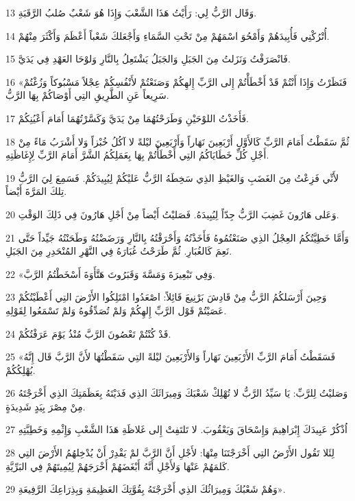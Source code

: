 \par 13 وَقَال الرَّبُّ لِي: رَأَيْتُ هَذَا الشَّعْبَ وَإِذَا هُوَ شَعْبٌ صُلبُ الرَّقَبَةِ.
\par 14 أُتْرُكْنِي فَأُبِيدَهُمْ وَأَمْحُوَ اسْمَهُمْ مِنْ تَحْتِ السَّمَاءِ وَأَجْعَلكَ شَعْباً أَعْظَمَ وَأَكْثَرَ مِنْهُمْ.
\par 15 فَانْصَرَفْتُ وَنَزَلتُ مِنَ الجَبَلِ وَالجَبَلُ يَشْتَعِلُ بِالنَّارِ وَلوْحَا العَهْدِ فِي يَدَيَّ.
\par 16 «فَنَظَرْتُ وَإِذَا أَنْتُمْ قَدْ أَخْطَأْتُمْ إِلى الرَّبِّ إِلهِكُمْ وَصَنَعْتُمْ لأَنْفُسِكُمْ عِجْلاً مَسْبُوكاً وَزُغْتُمْ سَرِيعاً عَنِ الطَّرِيقِ التِي أَوْصَاكُمْ بِهَا الرَّبُّ.
\par 17 فَأَخَذْتُ اللوْحَيْنِ وَطَرَحْتُهُمَا مِنْ يَدَيَّ وَكَسَّرْتُهُمَا أَمَامَ أَعْيُنِكُمْ.
\par 18 ثُمَّ سَقَطْتُ أَمَامَ الرَّبِّ كَالأَوَّلِ أَرْبَعِينَ نَهَاراً وَأَرْبَعِينَ ليْلةً لا آكُلُ خُبْزاً وَلا أَشْرَبُ مَاءً مِنْ أَجْلِ كُلِّ خَطَايَاكُمُ التِي أَخْطَأْتُمْ بِهَا بِعَمَلِكُمُ الشَّرَّ أَمَامَ الرَّبِّ لِإِغَاظَتِهِ.
\par 19 لأَنِّي فَزِعْتُ مِنَ الغَضَبِ وَالغَيْظِ الذِي سَخِطَهُ الرَّبُّ عَليْكُمْ لِيُبِيدَكُمْ. فَسَمِعَ لِيَ الرَّبُّ تِلكَ المَرَّةَ أَيْضاً.
\par 20 وَعَلى هَارُونَ غَضِبَ الرَّبُّ جِدّاً لِيُبِيدَهُ. فَصَليْتُ أَيْضاً مِنْ أَجْلِ هَارُونَ فِي ذَلِكَ الوَقْتِ.
\par 21 وَأَمَّا خَطِيَّتُكُمُ العِجْلُ الذِي صَنَعْتُمُوهُ فَأَخَذْتُهُ وَأَحْرَقْتُهُ بِالنَّارِ وَرَضَضْتُهُ وَطَحَنْتُهُ جَيِّداً حَتَّى نَعِمَ كَالغُبَارِ. ثُمَّ طَرَحْتُ غُبَارَهُ فِي النَّهْرِ المُنْحَدِرِ مِنَ الجَبَلِ.
\par 22 «وَفِي تَبْعِيرَةَ وَمَسَّةَ وَقَبَرُوتَ هَتَّأَوَةَ أَسْخَطْتُمُ الرَّبَّ.
\par 23 وَحِينَ أَرْسَلكُمُ الرَّبُّ مِنْ قَادِشَ بَرْنِيعَ قَائِلاً: اصْعَدُوا امْتَلِكُوا الأَرْضَ التِي أَعْطَيْتُكُمْ عَصَيْتُمْ قَوْل الرَّبِّ إِلهِكُمْ وَلمْ تُصَدِّقُوهُ وَلمْ تَسْمَعُوا لِقَوْلِهِ.
\par 24 قَدْ كُنْتُمْ تَعْصُونَ الرَّبَّ مُنْذُ يَوْمَ عَرَفْتُكُمْ.
\par 25 «فَسَقَطْتُ أَمَامَ الرَّبِّ الأَرْبَعِينَ نَهَاراً وَالأَرْبَعِينَ ليْلةً التِي سَقَطْتُهَا لأَنَّ الرَّبَّ قَال إِنَّهُ يُهْلِكُكُمْ.
\par 26 وَصَليْتُ لِلرَّبِّ: يَا سَيِّدُ الرَّبُّ لا تُهْلِكْ شَعْبَكَ وَمِيرَاثَكَ الذِي فَدَيْتَهُ بِعَظَمَتِكَ الذِي أَخْرَجْتَهُ مِنْ مِصْرَ بِيَدٍ شَدِيدَةٍ.
\par 27 اُذْكُرْ عَبِيدَكَ إِبْرَاهِيمَ وَإِسْحَاقَ وَيَعْقُوبَ. لا تَلتَفِتْ إِلى غَلاظَةِ هَذَا الشَّعْبِ وَإِثْمِهِ وَخَطِيَّتِهِ
\par 28 لِئَلا تَقُول الأَرْضُ التِي أَخْرَجْتَنَا مِنْهَا: لأَجْلِ أَنَّ الرَّبَّ لمْ يَقْدِرْ أَنْ يُدْخِلهُمُ الأَرْضَ التِي كَلمَهُمْ عَنْهَا وَلأَجْلِ أَنَّهُ أَبْغَضَهُمْ أَخْرَجَهُمْ لِيُمِيتَهُمْ فِي البَرِّيَّةِ.
\par 29 وَهُمْ شَعْبُكَ وَمِيرَاثُكَ الذِي أَخْرَجْتَهُ بِقُوَّتِكَ العَظِيمَةِ وَبِذِرَاعِكَ الرَّفِيعَةِ».

